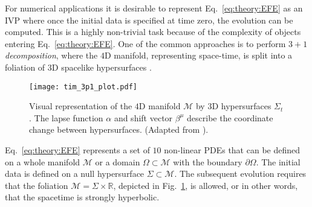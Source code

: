 For numerical applications it is desirable to represent Eq.~\eqref{eq:theory:EFE} 
as an \ac{IVP} where once the initial data is specified at time zero, 
the evolution can be computed. 
This is a highly non-trivial task because of the complexity of objects entering 
Eq.~\eqref{eq:theory:EFE}. One of the common approaches is to perform 
\textit{$3+1$ decomposition}, where the $4$D manifold, representing space-time, 
is split into a foliation of $3$D spacelike hypersurfaces 
\citep{Alcubierre:2008,Baumgarte:2010,Gourgoulhon:2007ue,Rezzolla:2013}.


\begin{figure}[t]
    \centering 
    \texttt{[image: tim\_3p1\_plot.pdf]}
    \caption{
        Visual representation of the $4$D manifold $\mathcal{M}$ by $3$D hypersurfaces 
        $\Sigma_t$. The lapse function $\alpha$ and shift vector $\beta^{\mu}$ describe the 
        coordinate change between hypersurfaces.
        (Adapted from \citet{Dietrich:2016phd}).
    }
    \label{fig:theory:3p1}
\end{figure}

Eq.~\eqref{eq:theory:EFE} represents a set of $10$ non-linear \acp{PDE} 
that can be defined on a whole manifold $\mathcal{M}$ or a domain $\Omega\subset\mathcal{M}$ 
with the boundary $\partial\Omega$. %
%
The initial data is defined on a null hypersurface $\Sigma\subset\mathcal{M}$. 
The subsequent evolution requires that the foliation 
$\mathcal{M}=\Sigma\times\mathbb{R}$, depicted in Fig.~\ref{fig:theory:3p1}, 
is allowed, or in other words, that the spacetime is strongly hyperbolic. 
%



